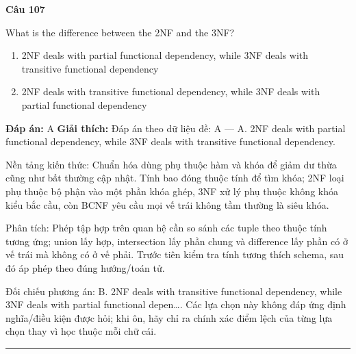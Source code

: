 \documentclass[11pt,a4paper]{article}
\newenvironment{question}[1]{%
  \par\vspace{1em}\noindent\textbf{\large Câu #1}\par\vspace{0.4em}
}{%
  \par\vspace{1em}\hrule\vspace{0.6em}
}
\newenvironment{choices}{%
  \begin{enumerate}[label=\textbf{\Alph*.},leftmargin=2.2em,itemsep=2pt,topsep=3pt]
}{%
  \end{enumerate}
}
\newcommand{\choice}{\item}
\begin{document}
\begin{question}{107}
What is the difference between the 2NF and the 3NF?
\begin{choices}
\choice 2NF deals with partial functional dependency, while 3NF deals with transitive functional dependency
\choice 2NF deals with transitive functional dependency, while 3NF deals with partial functional dependency
\end{choices}
\textbf{Đáp án:} A
\textbf{Giải thích:} Đáp án theo dữ liệu đề: A — A. 2NF deals with partial functional dependency, while 3NF deals with transitive functional dependency.

Nền tảng kiến thức: Chuẩn hóa dùng phụ thuộc hàm và khóa để giảm dư thừa cũng như bất thường cập nhật. Tính bao đóng thuộc tính để tìm khóa; 2NF loại phụ thuộc bộ phận vào một phần khóa ghép, 3NF xử lý phụ thuộc không khóa kiểu bắc cầu, còn BCNF yêu cầu mọi vế trái không tầm thường là siêu khóa.

Phân tích: Phép tập hợp trên quan hệ cần so sánh các tuple theo thuộc tính tương ứng; union lấy hợp, intersection lấy phần chung và difference lấy phần có ở vế trái mà không có ở vế phải. Trước tiên kiểm tra tính tương thích schema, sau đó áp phép theo đúng hướng/toán tử.

Đối chiếu phương án: B. 2NF deals with transitive functional dependency, while 3NF deals with partial functional depen…. Các lựa chọn này không đáp ứng định nghĩa/điều kiện được hỏi; khi ôn, hãy chỉ ra chính xác điểm lệch của từng lựa chọn thay vì học thuộc mỗi chữ cái.
\end{question}
\end{document}
